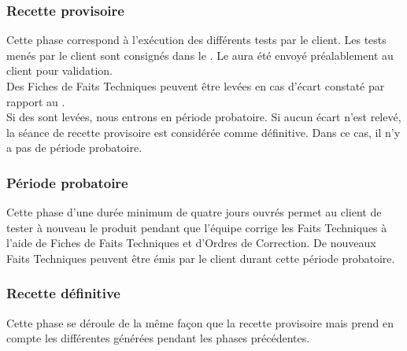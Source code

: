 \subsubsection*{Recette provisoire}

Cette phase correspond à l’exécution des différents tests par le client. Les tests menés par le client sont consignés dans le \CDR{}. Le \CDR{} aura été envoyé préalablement au client pour validation. \\

Des Fiches de Faits Techniques peuvent être levées en cas d’écart constaté par rapport au \CDR{}.\\

Si des \FFTCourt{} sont levées, nous entrons en période probatoire. Si aucun écart n’est relevé, la séance de recette provisoire est considérée comme définitive. Dans ce cas, il n’y a pas de période probatoire.

\subsubsection*{Période probatoire}

Cette phase d’une durée minimum de quatre jours ouvrés permet au client de tester à nouveau le produit pendant que l’équipe \PICCourt corrige les Faits Techniques à l’aide de Fiches de Faits Techniques et d’Ordres de Correction. De nouveaux Faits Techniques peuvent être émis par le client durant cette période probatoire.

\subsubsection*{Recette définitive }

Cette phase se déroule de la même façon que la recette provisoire mais prend en compte les différentes \FFTCourt{} générées pendant les phases précédentes. \\

